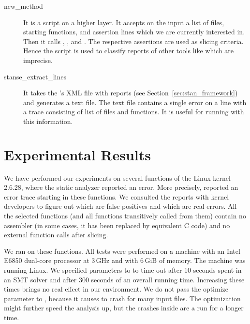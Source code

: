 \begin{description}
\item[\textsf{new\_method}] It is a script on a higher layer. It accepts on
the input a list of files, starting functions, and assertion lines which we
are currently interested in. Then it calls , ,
and . The respective assertions are used as slicing criteria.
Hence the script is used to classify reports of other tools like \stan which
are imprecise.

\item[\textsf{stanse\_extract\_lines}] It takes the \stan's XML file with
reports (see Section~\ref{sec:stan_framework}) and generates a text file. The
text file contains a single error on a line with a trace consisting of list of
files and functions. It is useful for running  with this
information.

\end{description}

\section{Experimental Results}\label{sec:fmics_experiments}

We have performed our experiments on several functions of the Linux kernel
2.6.28, where the static analyzer \stan reported an error. More precisely,
\stan reported an error trace starting in these functions. We consulted the
reports with kernel developers to figure out which are false positives and
which are real errors. All the selected functions (and all functions
transitively called from them) contain no assembler (in some cases, it has
been replaced by equivalent C code) and no external function calls after
slicing.

We ran \symbio on these functions. All tests were performed on a machine with
an Intel E6850 dual-core processor at 3\,GHz and with 6\,GiB of memory. The
machine was running Linux. We specified parameters to \klee to time out after
10 seconds spent in an SMT solver and after 300 seconds of an overall running
time. Increasing these times brings no real effect in our environment. We do
not pass the optimize parameter to \klee, because it causes \klee to crash for
many input files. The optimization might further speed the analysis up, but
the crashes inside \klee are a run for a longer time.

